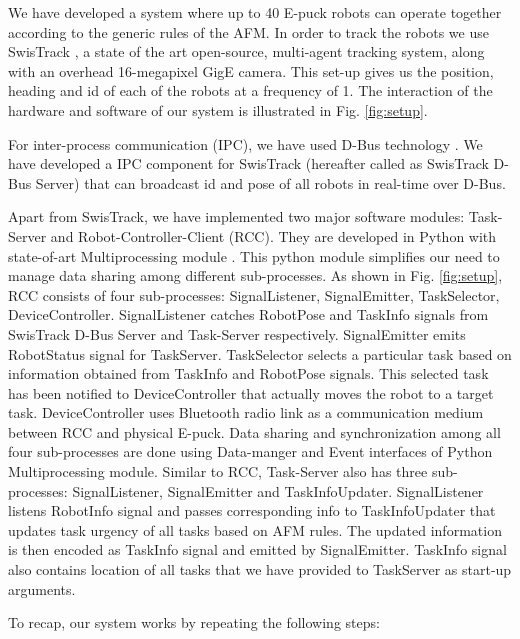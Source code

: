 \documentclass{llncs}
\begin{document}
We have developed a system where up to 40 E-puck robots \cite{Epuck} can operate together according to the generic rules of the AFM.  In order to track the robots we use SwisTrack \cite{SwisTrack}, a state of the art open-source, multi-agent tracking system, along with an overhead 16-megapixel GigE camera. This set-up gives us the position, heading and id of each of the robots at a frequency of 1. The interaction of the hardware and software of our system is illustrated in Fig. \ref{fig:setup}. 

For inter-process communication (IPC), we have used D-Bus technology \cite{DBus}. We have developed a IPC  component for SwisTrack (hereafter called as SwisTrack D-Bus Server) that can broadcast id and pose of all robots in real-time over D-Bus.

Apart from SwisTrack, we have implemented two major software modules: Task-Server and Robot-Controller-Client (RCC). They are developed in Python with state-of-art Multiprocessing module \cite{Multiprocessing}. This python module simplifies our need to manage data sharing among different sub-processes.  As shown in Fig. \ref{fig:setup}, RCC consists of four sub-processes: SignalListener, SignalEmitter, TaskSelector, DeviceController. SignalListener  catches RobotPose and TaskInfo signals from SwisTrack D-Bus Server and Task-Server respectively. SignalEmitter emits RobotStatus signal for TaskServer. TaskSelector selects a particular task based on information obtained from TaskInfo and RobotPose signals. This selected task has been notified to DeviceController that actually moves the robot to a target task.   DeviceController uses Bluetooth radio link as a communication medium between RCC and physical E-puck. Data sharing and synchronization among all four sub-processes are done using Data-manger and Event interfaces of Python Multiprocessing module. Similar to RCC, Task-Server also has three sub-processes: SignalListener, SignalEmitter and TaskInfoUpdater. SignalListener  listens RobotInfo signal and passes corresponding info to TaskInfoUpdater that updates task urgency of all tasks based on AFM rules. The updated information is then encoded as TaskInfo signal and emitted by SignalEmitter. TaskInfo signal also contains location of all tasks that we have provided to TaskServer as start-up arguments. 

To recap, our system works by repeating the following steps:
\end{document}
